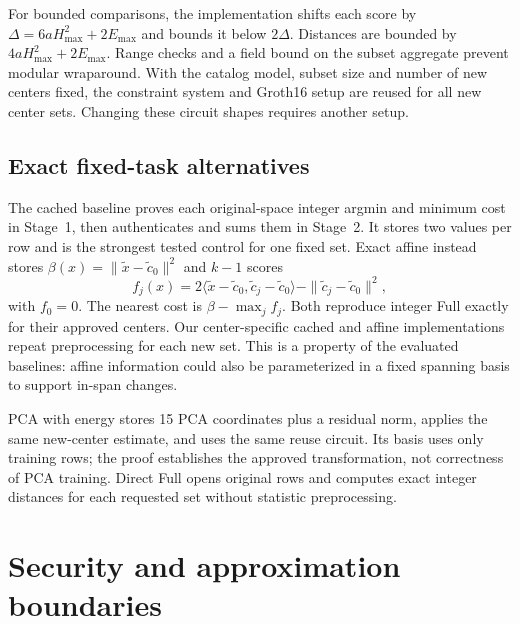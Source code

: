 \documentclass[5p,times,twocolumn]{elsarticle}
\theoremstyle{plain}
\theoremstyle{definition}
\theoremstyle{remark}
\begin{document}
\par\endgroup
\begingroup\color{RevisionGreen}
For bounded comparisons, the implementation shifts each score by
$\Delta=6aH_{\max}^2+2E_{\max}$ and bounds it below $2\Delta$. Distances are bounded by $4aH_{\max}^2+2E_{\max}$. Range checks and a field bound on the subset aggregate prevent modular wraparound. With the catalog model, subset size and number of new centers fixed, the constraint system and Groth16 setup are reused for all new center sets. Changing these circuit shapes requires another setup.


\par\endgroup
\subsection{\textcolor{RevisionGreen}{Exact fixed-task alternatives}}\label{sec:baselines}
\begingroup\color{RevisionGreen}
The cached baseline proves each original-space integer argmin and minimum cost in Stage~1, then authenticates and sums them in Stage~2. It stores two values per row and is the strongest tested control for one fixed set. Exact affine instead stores $\beta(x)=\|\widetilde x-\widetilde c_0\|^2$ and $k-1$ scores
\begin{equation}
f_j(x)=2\langle\widetilde x-\widetilde c_0,\widetilde c_j-\widetilde c_0\rangle-
\|\widetilde c_j-\widetilde c_0\|^2,
\end{equation}
with $f_0=0$. The nearest cost is $\beta-\max_j f_j$. Both reproduce integer Full exactly for their approved centers. Our center-specific cached and affine implementations repeat preprocessing for each new set. This is a property of the evaluated baselines: affine information could also be parameterized in a fixed spanning basis to support in-span changes.


\par\endgroup
\begingroup\color{RevisionGreen}
PCA with energy stores 15 PCA coordinates plus a residual norm, applies the same new-center estimate, and uses the same reuse circuit. Its basis uses only training rows; the proof establishes the approved transformation, not correctness of PCA training. Direct Full opens original rows and computes exact integer distances for each requested set without statistic preprocessing.


\par\endgroup


\section{\textcolor{RevisionGreen}{Security and approximation boundaries}}\label{sec:security}
\end{document}
